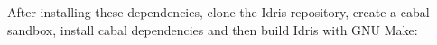 After installing these dependencies, clone the Idris repository, create a cabal sandbox, install cabal dependencies and then build Idris with GNU Make:
